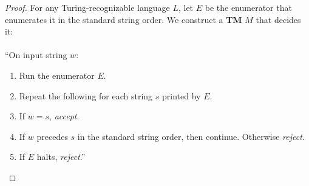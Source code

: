 \documentclass[11pt]{article}
\begin{document}
\begin{proof}
For any Turing-recognizable language $L$, let $E$ be the enumerator that enumerates it in the standard string order. We construct a \textbf{TM} $M$ that decides it:\\
\\
\textquotedblleft On input string $w$:
\begin{enumerate}
\item Run the enumerator $E$.
\item Repeat the following for each string $s$ printed by $E$.
\item \hspace*{0.5cm} If $w = s$, \textit{accept}.
\item \hspace*{0.5cm} If $w$ precedes $s$ in the standard string order, then continue. Otherwise \textit{reject}.
\item If $E$ halts, \textit{reject}.\textquotedblright
\end{enumerate}
\end{proof}
\end{document}
